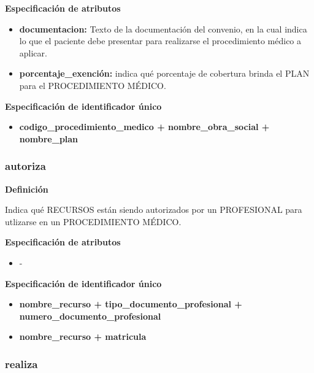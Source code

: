 \documentclass[a4paper,11pt]{article}
\begin{document}
\textbf{Especificación de atributos}

\begin{itemize}

     \item \textbf{documentacion:} Texto de la documentación del convenio, en la cual 
     indica lo que el paciente debe presentar para realizarse el procedimiento médico 
     a aplicar.

     \item \textbf{porcentaje\_exención:} indica qué porcentaje de cobertura brinda
     el PLAN para el PROCEDIMIENTO MÉDICO.
	 
\end{itemize}

\textbf{Especificación de identificador único}

\begin{itemize}

     \item \textbf{codigo\_procedimiento\_medico + nombre\_obra\_social + nombre\_plan}

\end{itemize}

\subsubsection{\textbf{autoriza}}

\textbf{Definición}

Indica qué RECURSOS están siendo autorizados por un PROFESIONAL para utlizarse en 
un PROCEDIMIENTO MÉDICO.

\textbf{Especificación de atributos}

\begin{itemize}
\item -
\end{itemize}

\textbf{Especificación de identificador único}

\begin{itemize}

     \item \textbf{nombre\_recurso + tipo\_documento\_profesional + numero\_documento\_profesional}	 
	 
     \item \textbf{nombre\_recurso + matricula}

\end{itemize}

\subsubsection{\textbf{realiza}}
\end{document}
